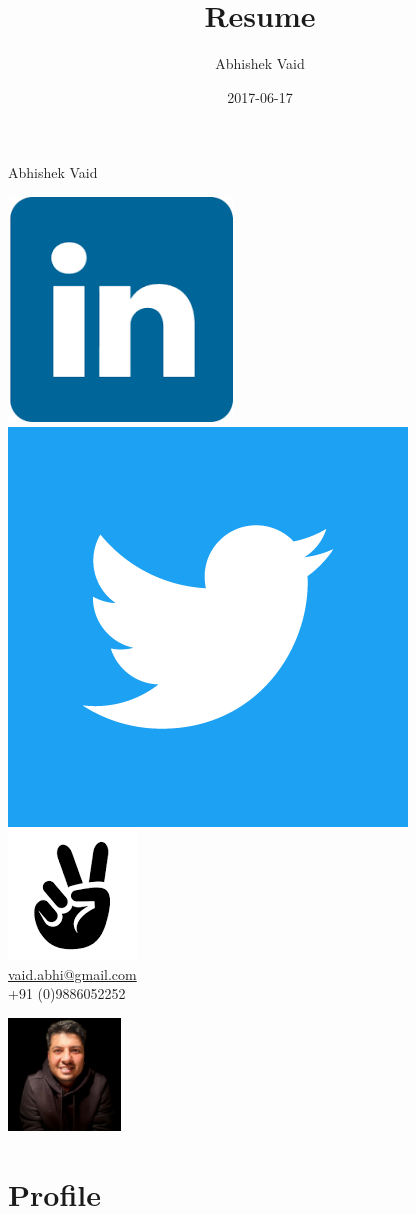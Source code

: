 \documentclass{article}
\title{Resume}
\date{2017-06-17}
\author{Abhishek Vaid}
\begin{document}
\begin{huge} 
	\noindent Abhishek Vaid \hspace{1ex}
\end{huge} \href{http://linkedin.com/in/vaidabhishek86}{\includegraphics[height=4ex]{linkedin}}
\hspace{4ex} \href{https://twitter.com/vaidabhishek}{\includegraphics[height=4ex]{twitter}}
\hspace{3ex} \href{https://angel.co/abhishek-vaid}{\includegraphics[height=4ex]{angellist}}\\
\noindent \href{mailto: vaid.abhi@gmail.com}{vaid.abhi@gmail.com} \\+91 (0)9886052252\\   
\vspace{-95pt}
\begin{flushright}
\includegraphics[width=3.0cm]{vaid}
\end{flushright}
 \vspace{-15pt}
\section{Profile}
\end{document}
